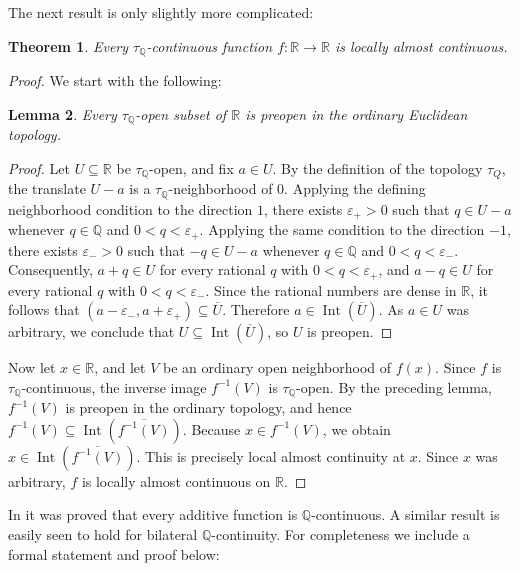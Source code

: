 \documentclass[11pt]{amsart} %
\newtheorem{theorem}{Theorem}[section]
\newtheorem{lemma}[theorem]{Lemma}
\theoremstyle{definition}
\newcommand{\Q}{\mathbb{Q}}
\begin{document}
The next result is only slightly more complicated: 

\begin{theorem}
Every $\tau_{\Q}$-continuous function $f:\mathbb R\to\mathbb R$ is locally almost continuous.
\end{theorem}

\begin{proof}

We start with the following: 

\begin{lemma}
Every $\tau_{\Q}$-open subset of $\mathbb R$ is preopen in the ordinary Euclidean topology.
\end{lemma}

\begin{proof}
Let $U\subseteq\mathbb R$ be $\tau_{\Q}$-open, and fix $a\in U$. By the definition of the topology $\tau_Q$, the translate $U-a$ is a $\tau_{\Q}$-neighborhood of $0$. Applying the defining neighborhood condition to the direction $1$, there exists $\varepsilon_+>0$ such that $q\in U-a$ whenever $q\in\mathbb Q$ and $0<q<\varepsilon_+$. Applying the same condition to the direction $-1$, there exists $\varepsilon_->0$ such that $-q\in U-a$ whenever $q\in\mathbb Q$ and $0<q<\varepsilon_-$. Consequently, $a+q\in U$ for every rational $q$ with $0<q<\varepsilon_+$, and $a-q\in U$ for every rational $q$ with $0<q<\varepsilon_-$. Since the rational numbers are dense in $\mathbb R$, it follows that $(a-\varepsilon_-,a+\varepsilon_+)\subseteq\overline{U}$. Therefore $a\in\operatorname{Int}(\overline{U})$. As $a\in U$ was arbitrary, we conclude that $U\subseteq\operatorname{Int}(\overline{U})$, so $U$ is preopen.
\end{proof}

Now let $x\in\mathbb R$, and let $V$ be an ordinary open neighborhood of $f(x)$. Since $f$ is $\tau_{\Q}$-continuous, the inverse image $f^{-1}(V)$ is $\tau_{\Q}$-open. By the preceding lemma, $f^{-1}(V)$ is preopen in the ordinary topology, and hence $f^{-1}(V)\subseteq\operatorname{Int}(\overline{f^{-1}(V)})$. Because $x\in f^{-1}(V)$, we obtain $x\in\operatorname{Int}(\overline{f^{-1}(V)})$. This is precisely local almost continuity at $x$. Since $x$ was arbitrary, $f$ is locally almost continuous on $\mathbb R$.
\end{proof}

In \cite{10} it was proved that every additive function is $\Q$-continuous. A similar result is easily seen to hold for bilateral $\Q$-continuity. For completeness we include a formal statement and proof below: 
\end{document}

